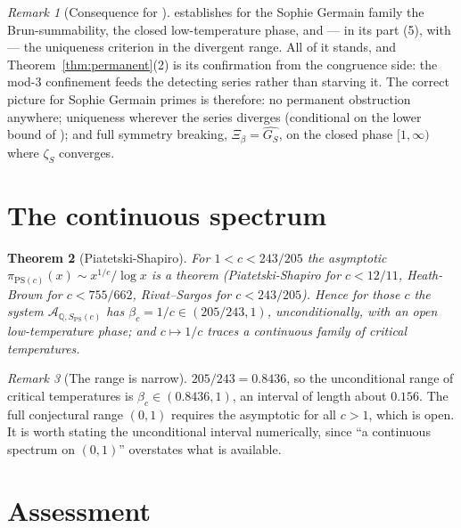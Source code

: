 \documentclass[11pt]{amsart}
\numberwithin{equation}{section}
\newtheorem{theorem}{Theorem}[section]
\theoremstyle{definition}
\theoremstyle{remark}
\newtheorem{remark}[theorem]{Remark}
\newcommand{\Q}{\mathbb{Q}}
\newcommand{\cA}{\mathcal{A}}
\begin{document}
\begin{remark}[Consequence for \cite{Main}]\label{rem:consequence}
\cite[Thm.~5.5]{Main} establishes for the Sophie Germain family the Brun-summability, the
closed low-temperature phase, and --- in its part (5), with \cite[Lem.~5.6]{Main} --- the
uniqueness criterion in the divergent range. All of it stands, and
Theorem~\ref{thm:permanent}(2) is its confirmation from the congruence side: the mod-$3$
confinement feeds the detecting series rather than starving it. The correct picture for
Sophie Germain primes is therefore: no permanent obstruction anywhere; uniqueness wherever
the series diverges (conditional on the lower bound of \cite[Thm.~5.5(2)]{Main}); and full
symmetry breaking, $\Xi_\beta=\widehat{G_S}$, on the closed phase $[1,\infty)$ where
$\zeta_S$ converges.
\end{remark}

\section{The continuous spectrum}

\begin{theorem}[Piatetski-Shapiro]\label{thm:PS}
For $1<c<243/205$ the asymptotic $\pi_{\mathrm{PS}(c)}(x)\sim x^{1/c}/\log x$ is a theorem
(Piatetski-Shapiro for $c<12/11$, Heath-Brown for $c<755/662$, Rivat--Sargos for
$c<243/205$). Hence for those $c$ the system $\cA_{\Q,S_{\mathrm{PS}}(c)}$ has
$\beta_c=1/c\in(205/243,1)$, unconditionally, with an open low-temperature phase; and
$c\mapsto1/c$ traces a continuous family of critical temperatures.
\end{theorem}

\begin{remark}[The range is narrow]\label{rem:narrow}
$205/243=0.8436$, so the unconditional range of critical temperatures is
$\beta_c\in(0.8436,1)$, an interval of length about $0.156$. The full conjectural range
$(0,1)$ requires the asymptotic for all $c>1$, which is open. It is worth stating the
unconditional interval numerically, since ``a continuous spectrum on $(0,1)$'' overstates
what is available.
\end{remark}

\section{Assessment}
\end{document}
